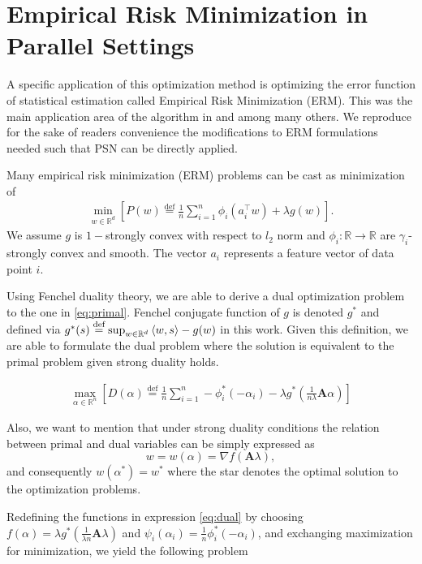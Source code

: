 \documentclass[11pt]{article}
\newcommand{\eqdef}{\overset{\text{def}}{=}}
\begin{document}
	\section{Empirical Risk Minimization in Parallel Settings}
	A specific application of this optimization method is optimizing the error function of statistical estimation called Empirical Risk Minimization (ERM). This was the main application area of the algorithm in \cite{SDNA} and \cite{Shalev-Shwartz2013} among many others. We reproduce for the sake of readers convenience the modifications to ERM formulations needed such that PSN can be directly applied.
	
	Many empirical risk minimization (ERM) problems can be cast as minimization of 
	\begin{eqnarray}\label{eq:primal}
		\min_{w \in \mathbb{R}^d} \left[ P(w) \eqdef \frac{1}{n} \sum_{i=1}^{n} \phi_i(a_i^\top w) + \lambda g(w) \right].
	\end{eqnarray}
	We assume $g$ is $1-$strongly convex with respect to $l_2$ norm and $\phi_i: \mathbb{R} \rightarrow \mathbb{R}$ are $\gamma_i$-strongly convex and smooth. The vector $a_i$ represents a feature vector of data point $i$.
	
	Using Fenchel duality theory, we are able to derive a dual optimization problem to the one in \eqref{eq:primal}. Fenchel conjugate function of $g$ is denoted $g^*$ and defined via $g^*(s) \eqdef \sup_{w\in \mathbb{R}^d} \braket{w,s} - g(w)$ in this work. Given this definition, we are able to formulate the dual problem where the solution is equivalent to the primal problem given strong duality holds.
	
	\begin{eqnarray} \label{eq:dual}
		\max_{\alpha \in \mathbb{R}^n} \left[   D(\alpha) \eqdef \frac{1}{n} \sum_{i=1}^{n} -\phi_i^*(-\alpha_i) - \lambda g^*\left(\frac{1}{n\lambda}\mathbf{A}\alpha\right) \right]
	\end{eqnarray}
	
	Also, we want to mention that under strong duality conditions the relation between primal and dual variables can be simply expressed as
	\begin{equation}
		w = w(\alpha ) = \nabla f (\mathbf{A}\lambda),
	\end{equation}
	and consequently $w(\alpha^*) = w^*$ where the star denotes the optimal solution to the optimization problems. 
	
	Redefining the functions in expression \eqref{eq:dual} by choosing $f(\alpha) = \lambda g^* (\frac{1}{\lambda n}\mathbf{A}\lambda)$ and $\psi_i (\alpha_i)= \frac{1}{n} \phi_i^*(-\alpha_i)$, and exchanging maximization for minimization, we yield the following problem
	
\end{document}
